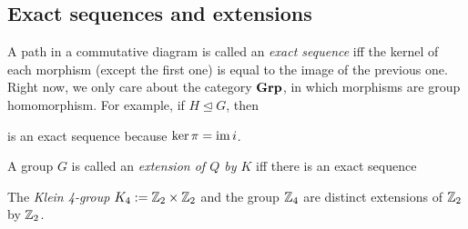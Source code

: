 \documentclass[class=article, crop=false]{standalone}
\begin{document}
\subsection{Exact sequences and extensions}
A path in a commutative diagram is called an \emph{exact sequence} iff the kernel of each morphism (except the first one) is equal to the image of the previous one. Right now, we only care about the category ${\normalfont\textbf{Grp}}$, in which morphisms are group homomorphism. For example, if $H \trianglelefteq G$, then
\begin{center}
\end{center}
is an exact sequence because $\ker \pi = \operatorname{im} i$.
\par
A group $G$ is called an \emph{extension of $Q$ by $K$} iff there is an exact sequence
\begin{center}
\end{center}
\begin{example}
    The \emph{Klein 4-group $K_4 := \mathbb{Z}_2 \times \mathbb{Z}_2$} and the group $\mathbb{Z}_4$ are distinct extensions of $\mathbb{Z}_2$ by $\mathbb{Z}_2$.
\end{example}
\end{document}
